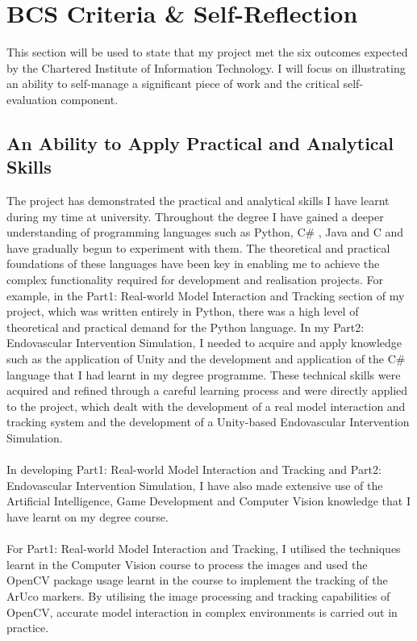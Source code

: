 \documentclass[12pt]{article}
\begin{document}
\section{BCS Criteria \& Self-Reflection}
This section will be used to state that my project met the six outcomes expected by the Chartered Institute of Information Technology\cite{BCS2020}. 
I will focus on illustrating an ability to self-manage a significant piece of work and the critical self-evaluation component.
\subsection{An Ability to Apply Practical and Analytical Skills}
The project has demonstrated the practical and analytical skills I have learnt during my time at university. Throughout the degree I have gained a deeper understanding of programming languages such as Python, C\# , Java and C\+\+ and have gradually begun to experiment with them. The theoretical and practical foundations of these languages have been key in enabling me to achieve the complex functionality required for development and realisation projects. For example, in the Part1: Real-world Model Interaction and Tracking section of my project, which was written entirely in Python, there was a high level of theoretical and practical demand for the Python language. In my Part2: Endovascular Intervention Simulation, I needed to acquire and apply knowledge such as the application of Unity and the development and application of the C\# language that I had learnt in my degree programme. These technical skills were acquired and refined through a careful learning process and were directly applied to the project, which dealt with the development of a real model interaction and tracking system and the development of a Unity-based Endovascular Intervention Simulation.
\\\\
In developing Part1: Real-world Model Interaction and Tracking and Part2: Endovascular Intervention Simulation, I have also made extensive use of the Artificial Intelligence, Game Development and Computer Vision knowledge that I have learnt on my degree course.
\\\\
For Part1: Real-world Model Interaction and Tracking, I utilised the techniques learnt in the Computer Vision course to process the images and used the OpenCV package usage learnt in the course to implement the tracking of the ArUco markers. By utilising the image processing and tracking capabilities of OpenCV, accurate model interaction in complex environments is carried out in practice.
\end{document}
